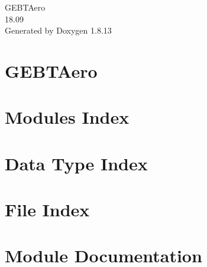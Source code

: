 \documentclass[twoside]{book}
\newcommand{\+}{\discretionary{\mbox{\scriptsize$\hookleftarrow$}}{}{}}
\newcommand{\clearemptydoublepage}{%
  \newpage{\pagestyle{empty}\cleardoublepage}%
}
\begin{document}
\hypersetup{pageanchor=false,
             bookmarksnumbered=true,
             pdfencoding=unicode
            }
\begin{titlepage}
\vspace*{7cm}
\begin{center}%
{\Large G\+E\+B\+T\+Aero \\[1ex]\large 18.\+09 }\\
\vspace*{1cm}
{\large Generated by Doxygen 1.8.13}\\
\end{center}
\end{titlepage}
\clearemptydoublepage
{}
\tableofcontents
\clearemptydoublepage
{}
\hypersetup{pageanchor=true}

\chapter{G\+E\+B\+T\+Aero}
\label{index}\hypertarget{index}{}
\chapter{Modules Index}

\chapter{Data Type Index}

\chapter{File Index}

\chapter{Module Documentation}




























\end{document}
